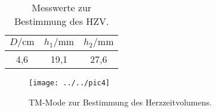 \begin{table}[htpb]
	\centering
	\caption{Messwerte zur Bestimmung des HZV.}
	\label{tab:herzzeitvol}
	\begin{tabular}{c c c}
		\toprule
		$D / \si{\cm}$ & $h_1 / \si{\milli\meter}$ & $h_2 / \si{\milli\meter}$ \\
		\midrule
		4,6 & 19,1 & 27,6 \\
		\bottomrule
	\end{tabular}
\end{table}

\begin{figure}[h!]
	\centering
	\texttt{[image: ../../pic4]}
	\caption{TM-Mode zur Bestimmung des Herzzeitvolumens.}
	\label{fig:pic4}
\end{figure}
